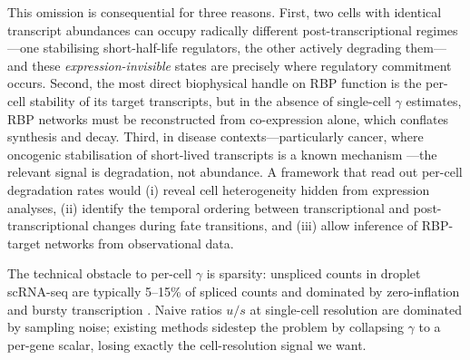 \documentclass{article}
\begin{document}
This omission is consequential for three reasons. First, two cells with identical transcript abundances can occupy radically different post-transcriptional regimes---one stabilising short-half-life regulators, the other actively degrading them---and these \textit{expression-invisible} states are precisely where regulatory commitment occurs. Second, the most direct biophysical handle on RBP function is the per-cell stability of its target transcripts, but in the absence of single-cell $\gamma$ estimates, RBP networks must be reconstructed from co-expression alone, which conflates synthesis and decay. Third, in disease contexts---particularly cancer, where oncogenic stabilisation of short-lived transcripts is a known mechanism \cite{dempster2021}---the relevant signal is degradation, not abundance. A framework that read out per-cell degradation rates would (i) reveal cell heterogeneity hidden from expression analyses, (ii) identify the temporal ordering between transcriptional and post-transcriptional changes during fate transitions, and (iii) allow inference of RBP-target networks from observational data.

The technical obstacle to per-cell $\gamma$ is sparsity: unspliced counts in droplet scRNA-seq are typically 5--15\% of spliced counts and dominated by zero-inflation and bursty transcription \cite{bergen2020}. Naive ratios $u/s$ at single-cell resolution are dominated by sampling noise; existing methods sidestep the problem by collapsing $\gamma$ to a per-gene scalar, losing exactly the cell-resolution signal we want.
\end{document}
